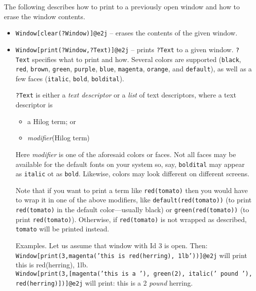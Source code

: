 The following describes how to print to a previously open window and how to
erase the window contents.
\begin{itemize}
\item  \texttt{Window[clear(?Window)]@\bs{}e2j} -- erases the contents of the given
  window. 

\item \texttt{Window[print(?Window,?Text)]@\bs{}e2j} -- prints \texttt{?Text} to a
  given window.  \texttt{?Text} specifies what to print and how. Several
  colors are supported (\texttt{black}, \texttt{red}, \texttt{brown},
  \texttt{green}, \texttt{purple}, \texttt{blue}, \texttt{magenta},
  \texttt{orange}, and \texttt{default}), as well as a few faces
  (\texttt{italic}, \texttt{bold}, \texttt{boldital}).

  \texttt{?Text} is either a \emph{text descriptor} or a \emph{list} of
  text descriptors, where a text descriptor is
  \begin{itemize}
  \item  a Hilog term; or
  \item  \emph{modifier}(Hilog term)
  \end{itemize}
  Here \emph{modifier} is one of the aforesaid colors or faces.
  Not all faces may be available for the default fonts on your system
  so, say, \texttt{boldital} may appear as \texttt{italic} ot as
  \texttt{bold}. Likewise, colors may look different on different screens.   

  Note that
  if you want to print a term like \texttt{red(tomato)} then you would have
  to wrap it in one of the above modifiers, like
  \texttt{default(red(tomato))} (to print \texttt{red(tomato)}  in the default
  color---usually black) or \texttt{green(red(tomato))} (to print
  {\color{green}\texttt{red(tomato)}}). Otherwise, if \texttt{red(tomato)}
  is not wrapped as described, 
  \texttt{{\color{red}tomato}}  will be printed instead.

  Examples. Let us assume that window with Id 3 is open. Then:\\
  \texttt{Window[print(3,magenta('this is red(herring), 1lb'))]@\bs{}e2j}
  will print
  {\color{magenta}this is red(herring), 1lb}.\\
   \texttt{Window[print(3,[magenta('this is a '), green(2),
       italic(' pound '), red(herring)])]@\bs{}e2j}
     will print: {\color{magenta}this is a} {\color{green}2} \emph{pound}
     {\color{red}herring}. 
\end{itemize}


